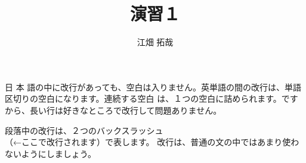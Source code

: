 \documentclass[a4j]{jarticle}
\title{演習１}
\author{江畑 拓哉}
\begin{document}
\maketitle

日
本
語の中に改行があっても、空白は入りません。英単語の間の改行は、単語区切りの空白になります。連続する空白       は、１つの空白に詰められます。ですから、長い行は好きなところで改行して問題ありません。

段落中の改行は、２つのバックスラッシュ\\（←ここで改行されます）で表します。
改行は、普通の文の中ではあまり使わないようにしましょう。
\end{document}
